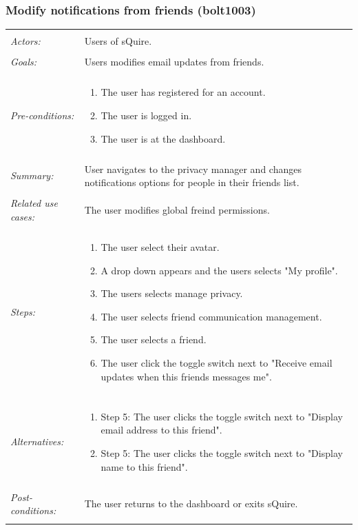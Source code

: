\documentclass[11pt]{report}
\begin{document}
\subsubsection{Modify notifications from friends (bolt1003)}
\begin{tabular}{ p{2cm} p{12cm} }
 \hline
 \\
 \textit{Actors:} & Users of sQuire. \\ 
 \\
 \textit{Goals:} & Users modifies email updates from friends. \\
 \\
 \textit{Pre-conditions:} & \begin{enumerate}
  \item The user has registered for an account.
  \item The user is logged in.
  \item The user is at the dashboard.
 \end{enumerate} \\
 \\
 \textit{Summary:} & User navigates to the privacy manager and changes notifications options for people in their friends list.\\ 
 \\
 \textit{Related use cases:} & The user modifies global freind permissions. \\ 
 \\
 \textit{Steps:} & \begin{enumerate}
  \item The user select their avatar.
  \item A drop down appears and the users selects "My profile".
  \item The users selects manage privacy.
  \item The user selects friend communication management.
  \item The user selects a friend.
  \item The user click the toggle switch next to "Receive email updates when this friends messages me".
 \end{enumerate} \\
 \\
 \textit{Alternatives:} & \begin{enumerate} 
  \item Step 5: The user clicks the toggle switch next to "Display email address to this friend".
  \item Step 5: The user clicks the toggle switch next to "Display name to this friend".
 \end{enumerate} \\
 \\
 \textit{Post-conditions:} & The user returns to the dashboard or exits sQuire. \\
 \\
\hline
\end{tabular}
\end{document}

